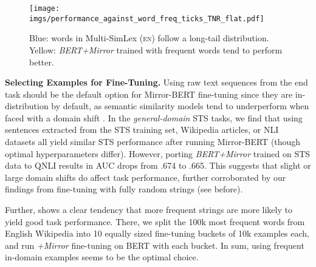 \documentclass[11pt]{article}
\newcommand{\en}{{\textsc{en}}\xspace}
\begin{document}
\begin{figure}[t!]
    \centering
    \texttt{[image: imgs/performance\_against\_word\_freq\_ticks\_TNR\_flat.pdf]}
    \vspace{-3.0mm}
    \caption{{\color{plot_greyblue}Blue}: words in Multi-SimLex (\en) follow a long-tail distribution. {\color{plot_yellow}Yellow}: \textit{BERT+Mirror} trained with frequent words tend to perform better.}
    \label{fig:word_freq}
\end{figure}













\vspace{1.5mm}
\noindent \textbf{Selecting Examples for Fine-Tuning.} Using raw text sequences from the end task should be the default option for Mirror-BERT fine-tuning since they are in-distribution by default, as semantic similarity models tend to underperform when faced with a domain shift \citep{zhang2020unsupervised}. In the \textit{general-domain} STS tasks, we find that using sentences extracted from the STS training set, Wikipedia articles, or NLI datasets all yield similar STS performance after running Mirror-BERT (though optimal hyperparameters differ). However, porting \textit{BERT+Mirror} trained on STS data to QNLI results in AUC drops from .674 to .665. This suggests that slight or large domain shifts do affect task performance, further corroborated by our findings from fine-tuning with fully random strings (see before). 





Further,  shows a clear tendency that more frequent strings are more likely to yield good task performance. There, we split the 100k most frequent words from English Wikipedia into 10 equally sized fine-tuning buckets of 10k examples each, and run \textit{+Mirror} fine-tuning on BERT with each bucket. In sum, using frequent in-domain examples seems to be the optimal choice.
\end{document}
